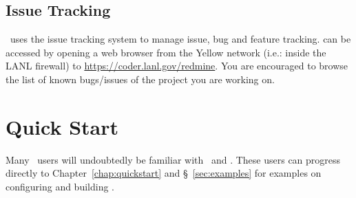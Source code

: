 \subsection{Issue Tracking}
\draco\ uses the   issue tracking system to manage issue, bug and feature tracking.  can be accessed by opening a web browser from the Yellow network (i.e.: inside the LANL firewall) to \url{https://coder.lanl.gov/redmine}. You are encouraged to browse the list of known bugs/issues of the project you are working on.


\section{Quick Start}
\label{sec:quick}

Many \draco\ users will undoubtedly be familiar with \cmake\ and \make. These users can progress directly to Chapter~\ref{chap:quickstart} and \S~\ref{sec:examples} for 
examples on configuring and building \draco. 

